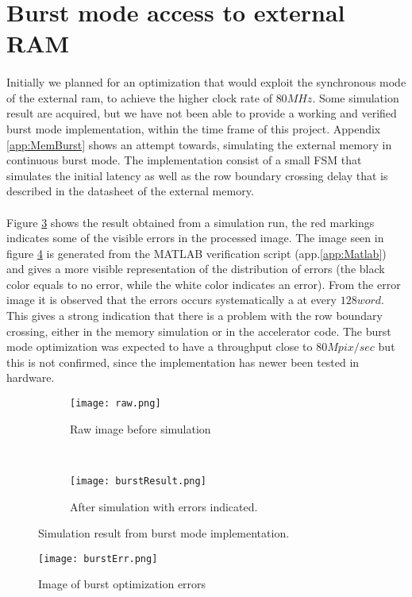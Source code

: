\section{Burst mode access to external RAM}
\paragraph*{}
Initially we planned for an optimization that would exploit the synchronous mode of the external ram, to achieve the higher clock rate of $80MHz$. Some simulation result are acquired, but we have not been able to provide a working and verified burst mode implementation, within the time frame of this project. Appendix \ref{app:MemBurst} shows an attempt towards, simulating the external memory in continuous burst mode. The implementation consist of a small FSM that simulates the initial latency as well as the row boundary crossing delay that is described in the datasheet \cite{Micron:CellularRAM} of the external memory.
\paragraph*{}
Figure \ref{fig:burst_picture} shows the result obtained from a simulation run, the red markings indicates some of the visible errors in the processed image. The image seen in figure \ref{fig:pic_burst_err} is generated from the MATLAB verification script (app.\ref{app:Matlab}) and gives a more visible representation of the distribution of errors (the black color equals to no error, while the white color indicates an error). From the error image it is observed that the errors occurs systematically a at every $128word$. This gives a strong indication that there is a problem with the row boundary crossing, either in the memory simulation or in the accelerator code.  The burst mode optimization was expected to have a throughput close to $80M pix/sec$ but this is not confirmed, since the implementation has newer been tested in hardware.
     
\begin{figure}[H]
	\centering
	\begin{subfigure}[b]{0.5\textwidth}
		\texttt{[image: raw.png]}
		\caption{Raw image before simulation}
		\label{fig:raw_burst}
    \end{subfigure}%
        ~ %
    \begin{subfigure}[b]{0.5\textwidth}
    	\texttt{[image: burstResult.png]}
    	\caption{After simulation with errors indicated.}
    	\label{fig:burst_picture_sobel}
	\end{subfigure}
	\caption{Simulation result from burst mode implementation.}
    	\label{fig:burst_picture}
\end{figure}


\begin{figure}[H]
	\centering
	\texttt{[image: burstErr.png]}
	\caption{Image of burst optimization errors}
	\label{fig:pic_burst_err}
\end{figure}